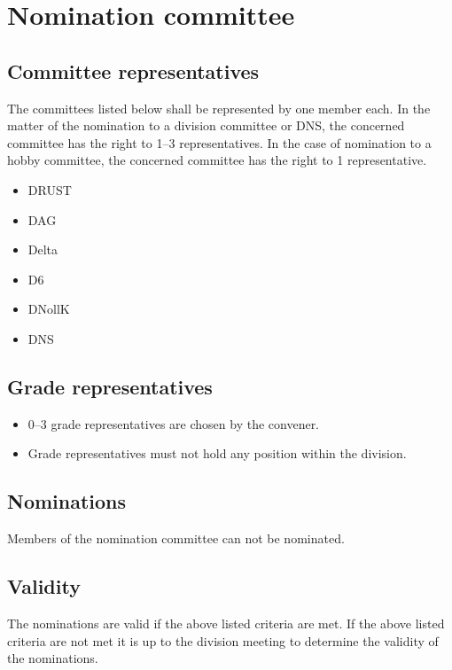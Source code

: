 \section{Nomination committee}
\subsection{Committee representatives}
The committees listed below shall be represented by one member each. In the matter of the nomination to a division committee or DNS, the concerned committee has the right to 1--3 representatives. In the case of nomination to a hobby committee, the concerned committee has the right to 1 representative. 

\begin{itemize}
  \item DRUST 
  \item DAG 
  \item Delta 
  \item D6 
  \item DNollK
  \item DNS
\end{itemize}

\subsection{Grade representatives}
\begin{itemize}
  \item 0--3 grade representatives are chosen by the convener. 
  \item Grade representatives must not hold any position within the division. 
\end{itemize}
\subsection{Nominations}
Members of the nomination committee can not be nominated. 

\subsection{Validity}
The nominations are valid if the above listed criteria are met. If the above listed criteria are not met it is up to the division meeting to determine the validity of the nominations. 
